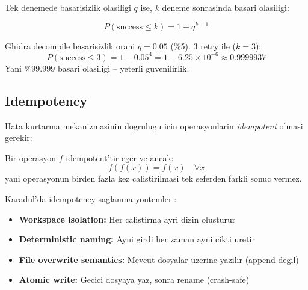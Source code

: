 Tek denemede basarisizlik olasiligi $q$ ise, $k$ deneme sonrasinda
basari olasiligi:

\begin{equation}
  P(\text{success} \leq k) = 1 - q^{k+1}
  \label{eq:retry-success}
\end{equation}

\begin{example}
Ghidra decompile basarisizlik orani $q = 0.05$ (\%5).
3 retry ile ($k = 3$):
\begin{equation}
  P(\text{success} \leq 3) = 1 - 0.05^4 = 1 - 6.25 \times 10^{-6} \approx 0.9999937
\end{equation}
Yani \%99.999 basari olasiligi -- yeterli guvenilirlik.
\end{example}

\subsection{Idempotency}

Hata kurtarma mekanizmasinin dogrulugu icin operasyonlarin \emph{idempotent}
olmasi gerekir:

\begin{tanim}[Idempotency]
Bir operasyon $f$ idempotent'tir eger ve ancak:
\begin{equation}
  f(f(x)) = f(x) \quad \forall x
  \label{eq:idempotent}
\end{equation}
yani operasyonun birden fazla kez calistirilmasi tek seferden farkli
sonuc vermez.
\end{tanim}

Karadul'da idempotency saglanma yontemleri:
\begin{itemize}
  \item \textbf{Workspace isolation:} Her calistirma ayri dizin olusturur
  \item \textbf{Deterministic naming:} Ayni girdi her zaman ayni cikti uretir
  \item \textbf{File overwrite semantics:} Mevcut dosyalar uzerine yazilir (append degil)
  \item \textbf{Atomic write:} Gecici dosyaya yaz, sonra rename (crash-safe)
\end{itemize}


